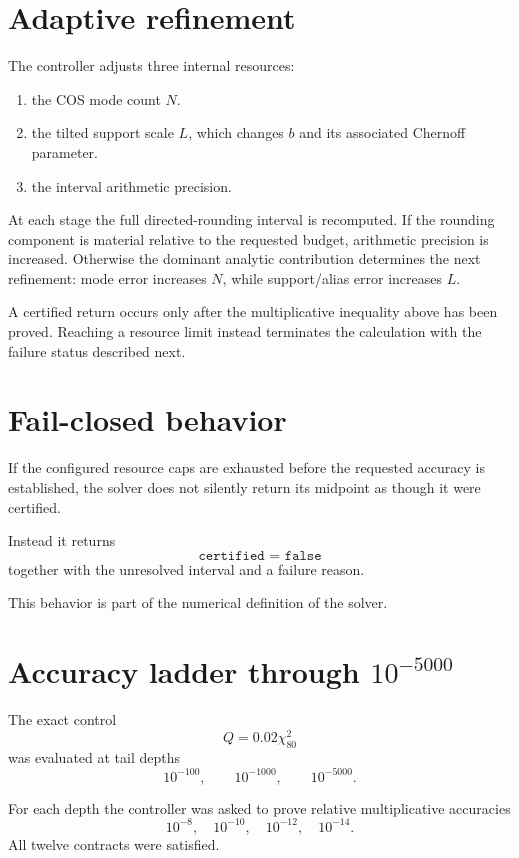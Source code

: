 \section{Adaptive refinement}

The controller adjusts three internal resources:

\begin{enumerate}
\item the COS mode count \(N\).
\item the tilted support scale \(L\), which changes \(b\) and its associated
Chernoff parameter.
\item the interval arithmetic precision.
\end{enumerate}

At each stage the full directed-rounding interval is recomputed.  If the
rounding component is material relative to the requested budget, arithmetic
precision is increased.  Otherwise the dominant analytic contribution
determines the next refinement: mode error increases \(N\), while
support/alias error increases \(L\).

A certified return occurs only after the multiplicative inequality above
has been proved. Reaching a resource limit instead terminates the calculation
with the failure status described next.

\section{Fail-closed behavior}

If the configured resource caps are exhausted before the requested accuracy
is established, the solver does not silently return its midpoint as though it
were certified.

Instead it returns
\[
\boxed{\texttt{certified = false}}
\]
together with the unresolved interval and a failure reason.

This behavior is part of the numerical definition of the solver.

\section{Accuracy ladder through \texorpdfstring{\(10^{-5000}\)}{1e-5000}}

The exact control
\[
Q=0.02\chi^2_{80}
\]
was evaluated at tail depths
\[
10^{-100},
\qquad
10^{-1000},
\qquad
10^{-5000}.
\]

For each depth the controller was asked to prove relative multiplicative
accuracies
\[
10^{-8},
\quad
10^{-10},
\quad
10^{-12},
\quad
10^{-14}.
\]
All twelve contracts were satisfied.

